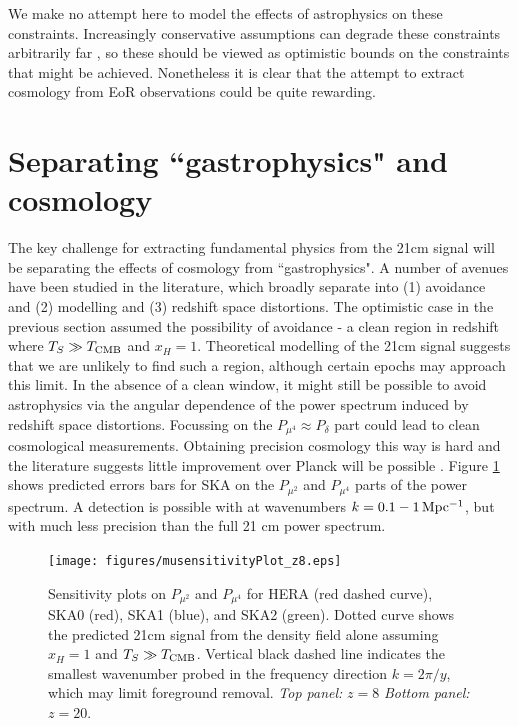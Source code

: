 \documentclass{PoS}
\begin{document}
We make no attempt here to model the effects of astrophysics on these constraints. Increasingly conservative assumptions can degrade these constraints arbitrarily far \citep{2008PhRvD..78b3529M}, so these should be viewed as optimistic bounds on the constraints that might be achieved. Nonetheless it is clear that the attempt to extract cosmology from EoR observations could be quite rewarding. 


\section{Separating ``gastrophysics" and cosmology}
\label{sec:separation}

The key challenge for extracting fundamental physics from the 21cm signal will be separating the effects of cosmology from ``gastrophysics". A number of avenues have been studied in the literature, which broadly separate into (1) avoidance and (2) modelling and (3) redshift space distortions. The optimistic case in the previous section assumed the possibility of avoidance - a clean region in redshift where $T_S\gg T_{\rm CMB}$ and $x_H=1$. Theoretical modelling of the 21cm signal \citep[e.g.][]{2008PhRvD..78j3511P,2011MNRAS.410.1377T,2013MNRAS.431..621M,2014MNRAS.437L..36F} suggests that we are unlikely to find such a region, although certain epochs may approach this limit. In the absence of a clean window, it might still be possible to avoid astrophysics via the angular dependence of the power spectrum induced by redshift space distortions. Focussing on the $P_{\mu^4}\approx P_\delta$ part could lead to clean cosmological measurements. Obtaining precision cosmology this way is hard and the literature suggests little improvement over Planck will be possible \citep{2006ApJ...653..815M,2008PhRvD..78b3529M}. Figure \ref{fig:musensitivity} shows predicted errors bars for SKA on the $P_{\mu^2}$ and $P_{\mu^4}$ parts of the power spectrum. A detection is possible with at wavenumbers $k=0.1-1{\rm\,Mpc^{-1}}$, but with much less precision than the full 21 cm power spectrum. 

\begin{figure}[htbp]
\begin{center}
\texttt{[image: figures/musensitivityPlot\_z8.eps]}
\caption{Sensitivity plots on $P_{\mu^2}$ and $P_{\mu^4}$ for HERA (red dashed curve), SKA0 (red), SKA1 (blue), and SKA2 (green). Dotted curve shows the predicted 21cm signal from the density field alone assuming $x_H=1$ and $T_S\gg T_{\rm CMB}$. Vertical black dashed line indicates the smallest wavenumber probed in the frequency direction $k=2\pi/y$, which may limit foreground removal.  {\em Top panel:} $z=8$ {\em Bottom panel:} $z=20$.}
\label{fig:musensitivity}
\end{center}
\end{figure}
\end{document}
